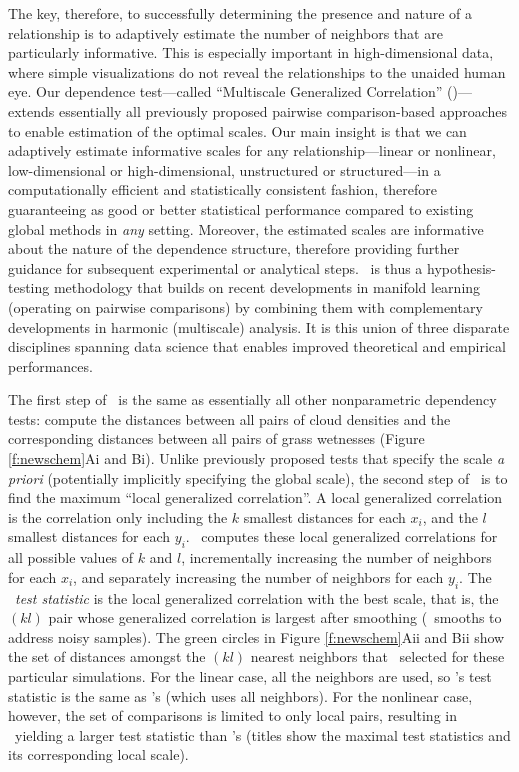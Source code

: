\documentclass[11pt]{article}
\begin{document}
The key, therefore, to successfully determining the presence and nature of a relationship is to adaptively estimate the number of neighbors that are particularly informative.
This is especially important in high-dimensional data, where simple visualizations do not reveal the relationships to the unaided human eye.
Our  dependence test---called ``Multiscale Generalized Correlation'' (\Mgc)---extends essentially all previously proposed pairwise comparison-based approaches to enable estimation of the  optimal scales.   
{Our main insight is that we can adaptively estimate informative scales for any relationship---linear or nonlinear, low-dimensional or high-dimensional, unstructured or structured---in a computationally efficient and statistically consistent fashion, therefore guaranteeing as good or better  statistical performance compared to existing global methods in \emph{any} setting.}
Moreover, the estimated scales are informative about the nature of the dependence structure, therefore providing further guidance for subsequent experimental or analytical steps. \Mgc~is thus a hypothesis-testing methodology that builds on recent developments in manifold learning (operating on pairwise comparisons) by combining them with complementary developments in harmonic (multiscale) analysis. 
It is this union of three disparate disciplines spanning data science that enables improved theoretical and empirical performances. 


The first step of \Mgc~is the same as essentially all other nonparametric dependency tests:
compute the distances between all pairs of cloud densities and the corresponding distances between all pairs of grass wetnesses (Figure \ref{f:newschem}{\color{magenta}Ai} and {\color{magenta}Bi}).
Unlike previously proposed tests that specify the scale \emph{a priori} (potentially implicitly specifying the global scale),  the second step of \Mgc~is to find the maximum ``local generalized correlation''.
A local generalized correlation is the correlation only including the $k$ smallest distances for each $x_i$, and the $l$ smallest distances for each  $y_i$.  \Mgc~computes these local generalized correlations for all possible values of $k$ and $l$, incrementally increasing the number of neighbors for each $x_i$, and separately increasing the number of neighbors for each $y_i$.
The \Mgc~\emph{test statistic} is the local generalized correlation with the best scale, that is, the $(kl)$ pair whose generalized correlation is largest after smoothing (\Mgc~smooths to address noisy samples). 
The green circles in Figure \ref{f:newschem}{\color{magenta}Aii} and {\color{magenta}Bii} show the set of distances amongst the $(kl)$ nearest neighbors that \Mgc~selected for these particular simulations.
For the linear case, all the neighbors are used, so  \Mgc's test statistic is the same as \Dcorr's (which uses all neighbors).  For the nonlinear case, however, the set of comparisons is limited to only local pairs, resulting in \Mgc~yielding a larger test statistic  than \Dcorr's (titles show the maximal test statistics and its corresponding local scale).   
\end{document}
